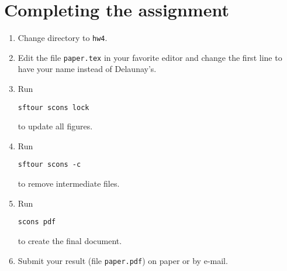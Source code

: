 \section{Completing the assignment}

\begin{enumerate}
\item Change directory to \texttt{hw4}.
\item Edit the file \texttt{paper.tex} in your favorite editor and change the
  first line to have your name instead of Delaunay's.
\item Run
\begin{verbatim}
sftour scons lock
\end{verbatim}
to update all figures.
\item Run
\begin{verbatim}
sftour scons -c
\end{verbatim}
to remove intermediate files.
\item Run
\begin{verbatim}
scons pdf
\end{verbatim}
to create the final document.
\item Submit your result (file \texttt{paper.pdf}) on paper or by
e-mail.
\end{enumerate}



